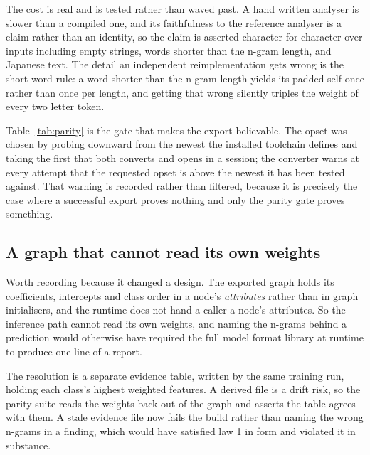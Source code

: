 The cost is real and is tested rather than waved past. A hand written analyser is
slower than a compiled one, and its faithfulness to the reference analyser is a
claim rather than an identity, so the claim is asserted character for character
over inputs including empty strings, words shorter than the n-gram length, and
Japanese text. The detail an independent reimplementation gets wrong is the
short word rule: a word shorter than the n-gram length yields its padded self
once rather than once per length, and getting that wrong silently triples the
weight of every two letter token.

\begin{table}[htbp]
  \centering
  \caption{The parity gate: the exported graph against the training time
  pipeline, on the full development split.}
  \label{tab:parity}
  
\end{table}

Table~\ref{tab:parity} is the gate that makes the export believable. The opset
was chosen by probing downward from the newest the installed toolchain defines
and taking the first that both converts and opens in a session; the converter
warns at every attempt that the requested opset is above the newest it has been
tested against. That warning is recorded rather than filtered, because it is
precisely the case where a successful export proves nothing and only the parity
gate proves something.

\subsection{A graph that cannot read its own weights}

Worth recording because it changed a design. The exported graph holds its
coefficients, intercepts and class order in a node's \emph{attributes} rather
than in graph initialisers, and the runtime does not hand a caller a node's
attributes. So the inference path cannot read its own weights, and naming the
n-grams behind a prediction would otherwise have required the full model format
library at runtime to produce one line of a report.

The resolution is a separate evidence table, written by the same training run,
holding each class's highest weighted features. A derived file is a drift risk,
so the parity suite reads the weights back out of the graph and asserts the
table agrees with them. A stale evidence file now fails the build rather than
naming the wrong n-grams in a finding, which would have satisfied law 1 in form
and violated it in substance.

